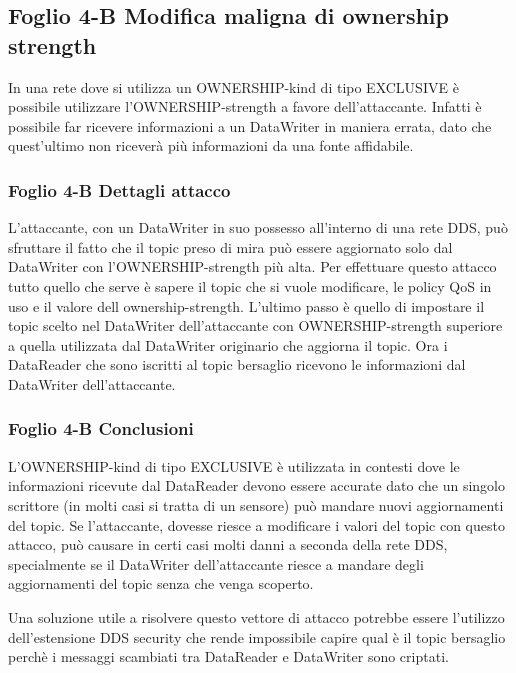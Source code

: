 



\subsection{Foglio 4-B Modifica maligna di ownership strength}
In una rete dove si utilizza un OWNERSHIP-kind di tipo EXCLUSIVE è possibile
utilizzare l'OWNERSHIP-strength a favore
dell'attaccante. Infatti è possibile far ricevere informazioni a un DataWriter
in maniera errata, dato che quest'ultimo non riceverà più informazioni da
una fonte affidabile.


\subsubsection{Foglio 4-B Dettagli attacco}
L'attaccante, con un DataWriter in suo possesso all'interno di una rete DDS,
può sfruttare il fatto che il topic preso di mira può essere aggiornato
solo dal DataWriter con l'OWNERSHIP-strength più alta.
Per effettuare questo attacco tutto quello che serve è sapere il topic che
si vuole modificare, le policy QoS in uso e il valore dell ownership-strength.
L'ultimo passo è quello di impostare il topic scelto nel DataWriter
dell'attaccante con OWNERSHIP-strength superiore a quella utilizzata dal
DataWriter originario che aggiorna il topic.
Ora i DataReader che sono iscritti al topic bersaglio
ricevono le informazioni dal DataWriter dell'attaccante.


\subsubsection{Foglio 4-B Conclusioni}
L'OWNERSHIP-kind di tipo EXCLUSIVE è utilizzata in contesti dove le
informazioni ricevute dal DataReader devono essere accurate dato che un singolo
scrittore (in molti casi si tratta di un sensore) può mandare nuovi aggiornamenti
del topic. Se l'attaccante, dovesse riesce a modificare i valori del topic con
questo attacco, può causare in certi casi molti danni a seconda della rete DDS,
specialmente se il DataWriter dell'attaccante riesce a mandare degli aggiornamenti
del topic senza che venga scoperto.


Una soluzione utile a risolvere questo vettore di attacco potrebbe essere l'utilizzo
dell'estensione DDS security che rende impossibile capire qual è il topic bersaglio
perchè i messaggi scambiati tra DataReader e DataWriter sono criptati.


